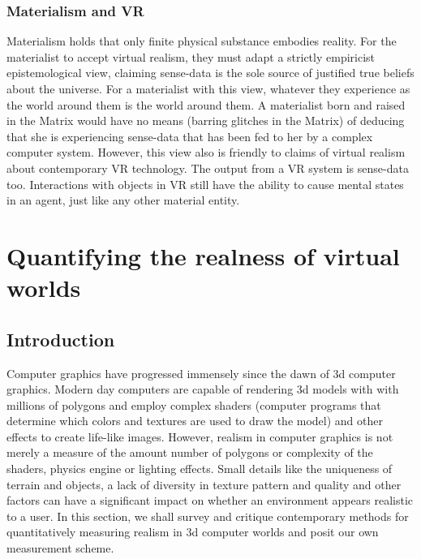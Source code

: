  



 \subsection{Materialism and VR}
Materialism holds that only finite physical substance embodies reality. For the materialist to accept virtual realism, they must adapt a strictly empiricist epistemological view, claiming sense-data is the sole source of justified true beliefs about the universe. For a materialist with this view, whatever they experience as the world around them is the world around them. A materialist born and raised in the Matrix would have no means (barring glitches in the Matrix) of deducing that she is experiencing sense-data that has been fed to her by a complex computer system. However, this view also is friendly to claims of virtual realism about contemporary VR technology. The output from a VR system is sense-data too. Interactions with objects in VR still have the ability to cause mental states in an agent, just like any other material entity.

 
\chapter{Quantifying the realness of virtual worlds }\label{text}
\section{Introduction}


Computer graphics have progressed immensely since the dawn of 3d computer graphics. Modern day computers are capable of rendering 3d models with with millions of polygons and employ complex shaders (computer programs that determine which colors and textures are used to draw the model) and other effects to create life-like images. However, realism in computer graphics is not merely a measure of the amount number of polygons or complexity of the shaders, physics engine or lighting effects. Small details like the uniqueness of terrain and objects, a lack of diversity in texture pattern and quality and other factors can have a significant impact on whether an environment appears realistic to a user. In this section, we shall survey and critique contemporary methods for quantitatively measuring realism in 3d computer worlds and posit our own measurement scheme. 
\\

